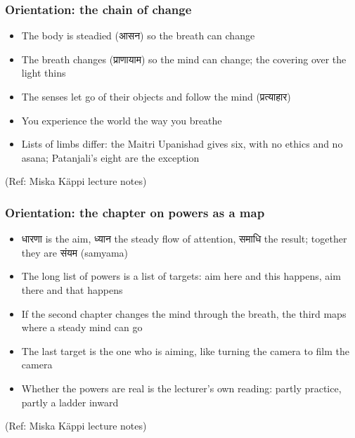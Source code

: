 \begin{frame}[fragile]\frametitle{Orientation: the chain of change}

	\begin{itemize}
	\item The body is steadied (आसन) so the breath can change
	\item The breath changes (प्राणायाम) so the mind can change; the covering over the light thins
	\item The senses let go of their objects and follow the mind (प्रत्याहार)
	\item You experience the world the way you breathe
	\item Lists of limbs differ: the Maitri Upanishad gives six, with no ethics and no asana; Patanjali's eight are the exception
	\end{itemize}

\tiny{(Ref: Miska Käppi lecture notes)}

\end{frame}

\begin{frame}[fragile]\frametitle{Orientation: the chapter on powers as a map}

	\begin{itemize}
	\item धारणा is the aim, ध्यान the steady flow of attention, समाधि the result; together they are संयम (samyama)
	\item The long list of powers is a list of targets: aim here and this happens, aim there and that happens
	\item If the second chapter changes the mind through the breath, the third maps where a steady mind can go
	\item The last target is the one who is aiming, like turning the camera to film the camera
	\item Whether the powers are real is the lecturer's own reading: partly practice, partly a ladder inward
	\end{itemize}

\tiny{(Ref: Miska Käppi lecture notes)}

\end{frame}

